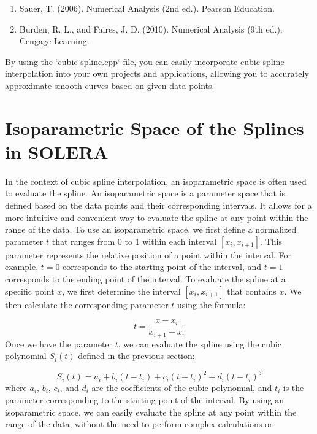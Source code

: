 \documentclass{article}
\begin{document}
\begin{enumerate}
    \item Sauer, T. (2006). Numerical Analysis (2nd ed.). Pearson Education.
    \item Burden, R. L., and Faires, J. D. (2010). Numerical Analysis (9th ed.). Cengage Learning.
\end{enumerate} 
By using the `cubic-spline.cpp` file, you can easily incorporate cubic spline interpolation into your own projects and applications, allowing you to accurately approximate smooth curves based on given data points.

\section{Isoparametric Space of the Splines in SOLERA}
In the context of cubic spline interpolation, an isoparametric space is often used to evaluate the spline. An isoparametric space is a parameter space that is defined based on the data points and their corresponding intervals. It allows for a more intuitive and convenient way to evaluate the spline at any point within the range of the data. To use an isoparametric space, we first define a normalized parameter $t$ that ranges from 0 to 1 within each interval $[x_i, x_{i+1}]$. This parameter represents the relative position of a point within the interval. For example, $t=0$ corresponds to the starting point of the interval, and $t=1$ corresponds to the ending point of the interval. To evaluate the spline at a specific point $x$, we first determine the interval $[x_i, x_{i+1}]$ that contains $x$. We then calculate the corresponding parameter $t$ using the formula:

\[
t = \frac{{x - x_i}}{{x_{i+1} - x_i}}
\]
Once we have the parameter $t$, we can evaluate the spline using the cubic polynomial $S_i(t)$ defined in the previous section:

\[
S_i(t) = a_i + b_i(t - t_i) + c_i(t - t_i)^2 + d_i(t - t_i)^3
\]
where $a_i$, $b_i$, $c_i$, and $d_i$ are the coefficients of the cubic polynomial, and $t_i$ is the parameter corresponding to the starting point of the interval. By using an isoparametric space, we can easily evaluate the spline at any point within the range of the data, without the need to perform complex calculations or transformations. It provides a more intuitive and convenient way to work with the spline interpolation method.

\section{Code Overview}
The `cubic-spline.cpp` file contains the implementation of cubic spline interpolation. Below is the complete source code:
\end{document}
